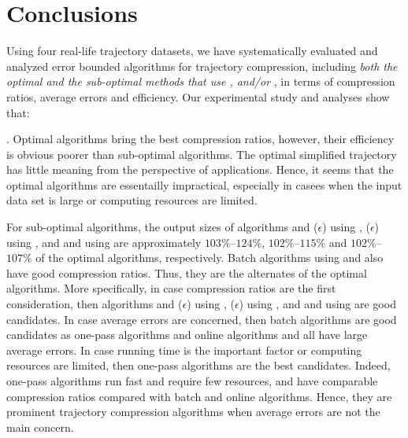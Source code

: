 \vspace{-1ex}
\section{Conclusions}

Using four real-life trajectory datasets, we have systematically evaluated and analyzed error bounded \lsa algorithms for trajectory compression, including \emph{both the optimal and the sub-optimal methods that use \ped, \sed and/or \dad},  in terms of compression ratios, average errors and efficiency.
Our experimental study and analyses show that:


. Optimal algorithms bring the best compression ratios, however, their efficiency is obvious poorer than sub-optimal algorithms. The optimal simplified trajectory has little meaning from the perspective of applications. Hence, it seems that the optimal algorithms are essentailly impractical, especially in casees when the input data set is large or computing resources are limited.

For sub-optimal algorithms, the output sizes of algorithms \bqsa and \siped($\epsilon$) using \ped, \cised($\epsilon$) using \sed, and \tpa and \interval using \dad are approximately $103\%$--$124\%$, $102\%$--$115\%$ and $102\%$--$107\%$ of the optimal algorithms, respectively. Batch algorithms using \ped and \sed also have good compression ratios. Thus, they are the alternates of the optimal algorithms.
%
More specifically, in case compression ratios are the first consideration, then algorithms \bqsa and \siped($\epsilon$) using \ped, \cised($\epsilon$) using \sed, and \tpa and \interval using \dad are good candidates.
%
In case average errors are concerned, then batch algorithms are good candidates as one-pass algorithms and online algorithms \opwa and \bqsa all have large average errors. %
%
In case running time is the important factor or computing resources are limited, then one-pass algorithms are the best candidates.
%
Indeed, one-pass algorithms run fast and require few resources, and have comparable compression ratios compared with batch and online algorithms. Hence, they are prominent trajectory compression algorithms when average errors are not the main concern.

